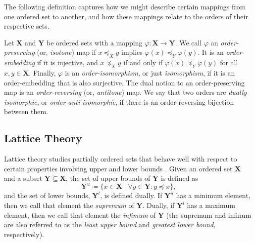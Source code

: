 The following definition captures how we might describe certain mappings from one ordered set to another, and how these
mappings relate to the orders of their respective sets.

\begin{definition}
	\label{definition:order-maps}    
	    

	Let $\mathbf{X}$ and $\mathbf{Y}$ be ordered sets with a mapping $\varphi : \mathbf{X}\to \mathbf{Y}$. We call $\varphi$
	an \textit{order-preserving} (or, \textit{isotone}) map if $x \preceq_{X}y$ implies $\varphi(x) \preceq_{Y}\varphi(y)$.
	It is an \textit{order-embedding} if it is injective, and $x \preceq_{X}y$ if and only if $\varphi(x) \preceq_{Y}\varphi
	(y)$ for all $x,y \in \mathbf{X}$. Finally, $\varphi$ is an \textit{order-isomorphism}, or just \textit{isomorphism}, if
	it is an order-embedding that is also surjective. The dual notion to an order-preserving map is an \textit{order-reversing}
	(or, \textit{antitone}) map. We say that two orders are \textit{dually isomorphic}, or \textit{order-anti-isomorphic},
	if there is an order-reversing bijection between them.
\end{definition}

\subsection{Lattice Theory}
\label{subsection:lattice-theory}

Lattice theory studies partially ordered sets that behave well with respect to certain properties involving upper and
lower bounds \cite{davey2002introduction}. Given an ordered set $\mathbf{X}$ and a subset $\mathbf{Y}\subseteq \mathbf{X}$,
the set of upper bounds of $\mathbf{Y}$ is defined as
\[
	\mathbf{Y}^{u}\coloneqq \{x \in \mathbf{X}\mid \forall y \in \mathbf{Y}: y \preceq x\},
\]
and the set of lower bounds, $\mathbf{Y}^{l}$, is defined dually. If $\mathbf{Y}^{u}$ has a minimum element, then we
call that element the \textit{supremum} of $\mathbf{Y}$. Dually, if $\mathbf{Y}^{l}$ has a maximum element, then we call
that element the \textit{infimum} of $\mathbf{Y}$ (the supremum and infinum are also referred to as the \textit{least
upper bound} and \textit{greatest lower bound}, respectively).

